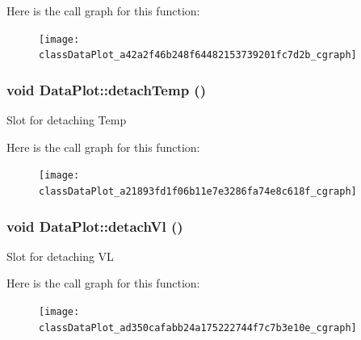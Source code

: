 Here is the call graph for this function:\nopagebreak
\begin{figure}[H]
\begin{center}
\leavevmode
\texttt{[image: classDataPlot\_a42a2f46b248f64482153739201fc7d2b\_cgraph]}
\end{center}
\end{figure}


\hypertarget{classDataPlot_a21893fd1f06b11e7e3286fa74e8c618f}{
\subsubsection[{detachTemp}]{\setlength{\rightskip}{0pt plus 5cm}void DataPlot::detachTemp ()}}
\label{classDataPlot_a21893fd1f06b11e7e3286fa74e8c618f}
Slot for detaching Temp 

Here is the call graph for this function:\nopagebreak
\begin{figure}[H]
\begin{center}
\leavevmode
\texttt{[image: classDataPlot\_a21893fd1f06b11e7e3286fa74e8c618f\_cgraph]}
\end{center}
\end{figure}


\hypertarget{classDataPlot_ad350cafabb24a175222744f7c7b3e10e}{
\subsubsection[{detachVl}]{\setlength{\rightskip}{0pt plus 5cm}void DataPlot::detachVl ()}}
\label{classDataPlot_ad350cafabb24a175222744f7c7b3e10e}
Slot for detaching VL 

Here is the call graph for this function:\nopagebreak
\begin{figure}[H]
\begin{center}
\leavevmode
\texttt{[image: classDataPlot\_ad350cafabb24a175222744f7c7b3e10e\_cgraph]}
\end{center}
\end{figure}


